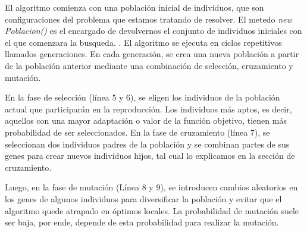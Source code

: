 



El algoritmo comienza con una población inicial de individuos, que son configuraciones del problema que estamos tratando de resolver. El metedo \emph{new Poblacion()} 
es el encargado de devolvernos el conjunto de individuos iniciales con el que comenzara la busqueda.
.
El algoritmo se ejecuta en ciclos repetitivos llamados generaciones. En cada generación, se crea una nueva población a partir de la población anterior mediante una combinación de selección, cruzamiento y mutación.

En la fase de selección (línea 5 y 6), se eligen los individuos de la población actual que participarán en la reproducción.
Los individuos más aptos, es decir, aquellos con una mayor adaptación o valor de la función objetivo, tienen más probabilidad de ser seleccionados.
En la fase de cruzamiento (línea 7), se seleccionan dos individuos padres de la población y se combinan partes de sus genes para crear nuevos individuos hijos, tal cual lo explicamos en la sección de cruzamiento. 

Luego, en la fase de mutación (Línea 8 y 9), se introducen cambios aleatorios en los genes de algunos individuos para diversificar la población y evitar que el algoritmo quede atrapado en óptimos locales. 
La probabilidad de mutación suele ser baja, por ende, depende de esta probabilidad para realizar la mutación.

